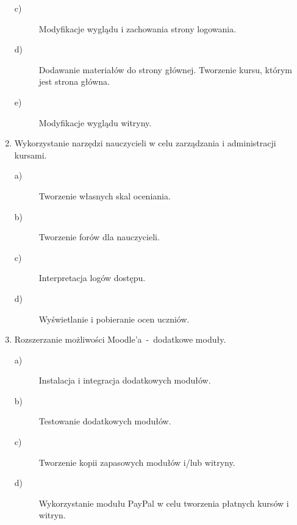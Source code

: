 \begin{enumerate}
\begin{description}
		\item[c)] Modyfikacje wyglądu i zachowania strony logowania.
		\item[d)] Dodawanie materiałów do strony głównej. Tworzenie kursu, którym jest strona główna.
		\item[e)] Modyfikacje wyglądu witryny.
	\end{description}
	\item Wykorzystanie narzędzi nauczycieli w celu zarządzania i administracji kursami.
	\begin{description}
		\item[a)] Tworzenie własnych skal oceniania.
		\item[b)] Tworzenie forów dla nauczycieli.
		\item[c)] Interpretacja logów dostępu.
		\item[d)] Wyświetlanie i pobieranie ocen uczniów.
	\end{description}
	\item Rozszerzanie możliwości Moodle'a~-~dodatkowe moduły.
	\begin{description}
		\item[a)] Instalacja i integracja dodatkowych modułów.
		\item[b)] Testowanie dodatkowych modułów.
		\item[c)] Tworzenie kopii zapasowych modułów i/lub witryny.
		\item[d)] Wykorzystanie modułu PayPal w celu tworzenia płatnych kursów i witryn.
	\end{description}
\end{enumerate}

